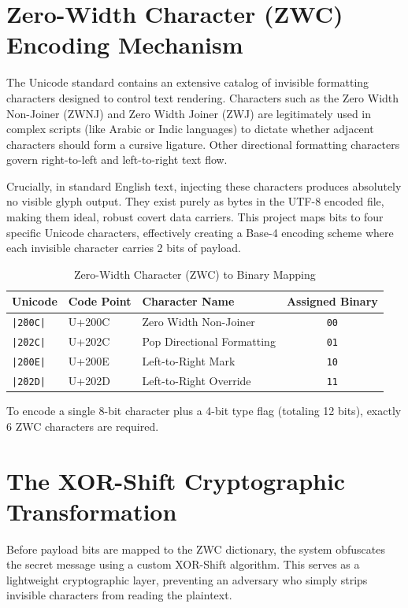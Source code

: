 \documentclass[12pt,a4paper]{report}
\begin{document}
\section{Zero-Width Character (ZWC) Encoding Mechanism}
The Unicode standard contains an extensive catalog of invisible formatting characters designed to control text rendering. Characters such as the Zero Width Non-Joiner (ZWNJ) and Zero Width Joiner (ZWJ) are legitimately used in complex scripts (like Arabic or Indic languages) to dictate whether adjacent characters should form a cursive ligature. Other directional formatting characters govern right-to-left and left-to-right text flow.

Crucially, in standard English text, injecting these characters produces absolutely no visible glyph output. They exist purely as bytes in the UTF-8 encoded file, making them ideal, robust covert data carriers. This project maps bits to four specific Unicode characters, effectively creating a Base-4 encoding scheme where each invisible character carries 2 bits of payload.

\begin{table}[H]
\centering
\caption{Zero-Width Character (ZWC) to Binary Mapping}
\label{tab:zwc_mapping}
\begin{tabular}{@{}lllc@{}}
\toprule
\textbf{Unicode} & \textbf{Code Point} & \textbf{Character Name} & \textbf{Assigned Binary} \\
\midrule
\texttt{|\u200C|} & U+200C & Zero Width Non-Joiner & \texttt{00} \\
\texttt{|\u202C|} & U+202C & Pop Directional Formatting & \texttt{01} \\
\texttt{|\u200E|} & U+200E & Left-to-Right Mark & \texttt{10} \\
\texttt{|\u202D|} & U+202D & Left-to-Right Override & \texttt{11} \\
\bottomrule
\end{tabular}
\end{table}

To encode a single 8-bit character plus a 4-bit type flag (totaling 12 bits), exactly 6 ZWC characters are required.

\section{The XOR-Shift Cryptographic Transformation}
Before payload bits are mapped to the ZWC dictionary, the system obfuscates the secret message using a custom XOR-Shift algorithm. This serves as a lightweight cryptographic layer, preventing an adversary who simply strips invisible characters from reading the plaintext.
\end{document}
